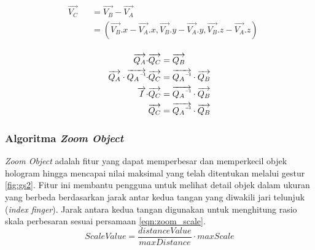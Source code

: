 \documentclass[conference]{IEEEtran}
\newcommand\inv[1]{#1\raisebox{1.15ex}{$\scriptscriptstyle-\!1$}}
\DeclareRobustCommand{\uvec}[1]{{%
		\ifcsname uvec#1\endcsname
		\csname uvec#1\endcsname
		\else
		\bm{\hat{\mathbf{#1}}}%
		\fi
}}
\begin{document}
			\vspace{-2ex}			
			\begin{equation}
			\begin{alignedat}{2}
			& \overrightarrow{V_{C}} &&= \overrightarrow{V_{B}} - \overrightarrow{V_{A}}\\
			& 		&&= (\overrightarrow{V_{B}}.x - \overrightarrow{V_{A}}.x, \overrightarrow{V_{B}}.y - \overrightarrow{V_{A}}.y, \overrightarrow{V_{B}}.z - \overrightarrow{V_{A}}.z)\\
			\end{alignedat}
			\label{eqn:position_target}
			\end{equation}
			
			\begin{equation}
			\begin{alignedat}{3}
			\overrightarrow{Q_{A}} \cdot & \overrightarrow{Q_{C}} &&= \overrightarrow{Q_{B}}\\ 
			\overrightarrow{Q_{A}} \cdot \overrightarrow{\inv{Q_{A}}} \cdot& \overrightarrow{Q_{C}} &&= \overrightarrow{\inv{Q_{A}}} \cdot \overrightarrow{Q_{B}}\\
			\overrightarrow{I} \cdot & \overrightarrow{Q_{C}} &&= \overrightarrow{\inv{Q_{A}}} \cdot \overrightarrow{Q_{B}}\\
			&\overrightarrow{Q_{C}} &&= \overrightarrow{\inv{Q_{A}}} \cdot \overrightarrow{Q_{B}}\\
			\end{alignedat}
			\label{eqn:rotation_target}
			\end{equation}
		
		\subsubsection{Algoritma \textit{Zoom Object}}
			\textit{Zoom Object} adalah fitur yang dapat memperbesar dan memperkecil objek hologram hingga mencapai nilai maksimal yang telah ditentukan melalui gestur \ref{fig:gs2}. Fitur ini membantu pengguna untuk melihat detail objek dalam ukuran yang berbeda berdasarkan jarak antar kedua tangan yang diwakili jari telunjuk (\textit{index finger}). Jarak antara kedua tangan digunakan untuk menghitung rasio skala perbesaran sesuai persamaan \ref{eqn:zoom_scale}.
			\begin{equation}
			ScaleValue = \frac{distanceValue}{maxDistance} \cdot maxScale
			\label{eqn:zoom_scale}
			\end{equation}
			
\end{document}
